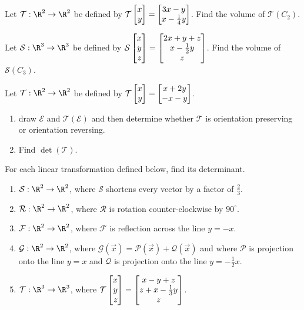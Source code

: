 \begin{exercises}
	\begin{problist}
		\prob Let $\mathcal{T}:\R^{2}\to\R^{2}$ be defined by $\mathcal{T}\mat{x\\y}
		=\matc{3x-y\\x-\tfrac{1}{4}y}$. Find the volume of $\mathcal{T}(C_{2})$.

		\prob Let $\mathcal{S}:\R^{3}\to\R^{3}$ be defined by
		$\mathcal{S}\mat{x\\y\\z}=\matc{2x+y+z\\x-\tfrac{1}{2}y\\z}$. Find the volume
		of $\mathcal{S}(C_{3})$.

		\prob Let $\mathcal{T}:\R^{2}\to\R^{2}$ be defined by $\mathcal{T}\mat{x\\y}
		=\matc{x+2y\\-x-y}$.
		\begin{enumerate}
			\item draw $\mathcal{E}$ and $\mathcal{T}(\mathcal{E})$ and then determine
				whether $\mathcal{T}$ is orientation preserving or orientation reversing.

			\item Find $\det(\mathcal{T})$.
		\end{enumerate}

		\prob For each linear transformation defined below, find its determinant.
		\begin{enumerate}
			\item $\mathcal{S}:\R^{2}\to\R^{2}$, where $\mathcal{S}$ shortens
				every vector by a factor of $\tfrac{2}{3}$.

			\item $\mathcal{R}:\R^{2}\to\R^{2}$, where $\mathcal{R}$ is rotation
				counter-clockwise by $90^{\circ}$.

			\item $\mathcal{F}:\R^{2}\to\R^{2}$, where $\mathcal{F}$ is
				reflection across the line $y=-x$.

			\item $\mathcal{G}:\R^{2}\to\R^{2}$, where
				$\mathcal{G}(\vec x)=\mathcal{P}(\vec x)+ \mathcal{Q}(\vec x)$
				and where $\mathcal{P}$ is projection onto the line $y=x$ and
				$\mathcal{Q}$ is projection onto the line $y=-\tfrac{1}{2}x$.

			\item $\mathcal{T}:\R^{3}\to\R^{3}$, where
				$\mathcal{T}\mat{x\\y\\z}=\matc{x-y+z\\z+x-\tfrac{1}{3}y\\z}$.


\end{enumerate}
\end{problist}
\end{exercises}
